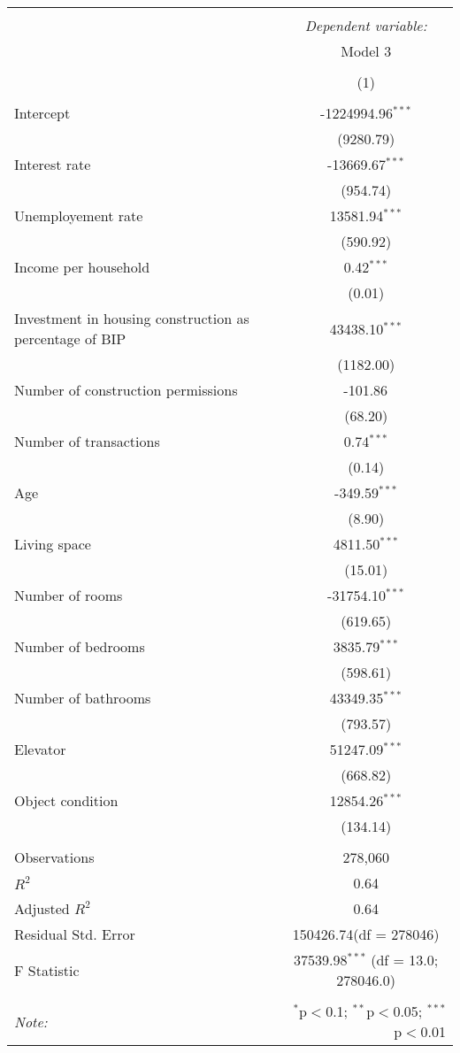 \begin{table}[!htbp] \centering
\begin{tabular}{@{\extracolsep{5pt}}lc}
\\[-1.8ex]\hline
\hline \\[-1.8ex]
& \multicolumn{1}{c}{\textit{Dependent variable:}} \
\cr \cline{1-2}
\\[-1.8ex] & \multicolumn{1}{c}{Model 3} \\\\[-1.8ex] & (1) \\
\hline \\[-1.8ex]
 Intercept & -1224994.96$^{***}$ \\
  & (9280.79) \\
 Interest rate & -13669.67$^{***}$ \\
  & (954.74) \\
 Unemployement rate & 13581.94$^{***}$ \\
  & (590.92) \\
 Income per household & 0.42$^{***}$ \\
  & (0.01) \\
 Investment in housing construction as percentage of BIP & 43438.10$^{***}$ \\
  & (1182.00) \\
 Number of construction permissions & -101.86$^{}$ \\
  & (68.20) \\
 Number of transactions & 0.74$^{***}$ \\
  & (0.14) \\
 Age & -349.59$^{***}$ \\
  & (8.90) \\
 Living space & 4811.50$^{***}$ \\
  & (15.01) \\
 Number of rooms & -31754.10$^{***}$ \\
  & (619.65) \\
 Number of bedrooms & 3835.79$^{***}$ \\
  & (598.61) \\
 Number of bathrooms & 43349.35$^{***}$ \\
  & (793.57) \\
 Elevator & 51247.09$^{***}$ \\
  & (668.82) \\
 Object condition & 12854.26$^{***}$ \\
  & (134.14) \\
\hline \\[-1.8ex]
 Observations & 278,060 \\
 $R^2$ & 0.64 \\
 Adjusted $R^2$ & 0.64 \\
 Residual Std. Error & 150426.74(df = 278046)  \\
 F Statistic & 37539.98$^{***}$ (df = 13.0; 278046.0) \\
\hline
\hline \\[-1.8ex]
\textit{Note:} & \multicolumn{1}{r}{$^{*}$p$<$0.1; $^{**}$p$<$0.05; $^{***}$p$<$0.01} \\
\end{tabular}
\end{table}